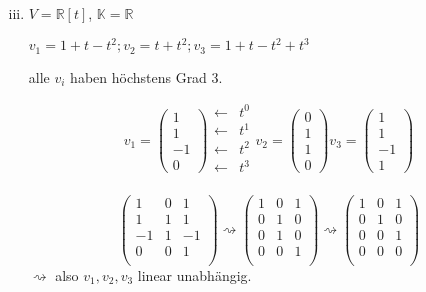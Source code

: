 \documentclass{article}
\begin{document}
\begin{enumerate}[(i)]
  \setcounter{enumi}{2}
\item $V = \mathbb{R}[t]$, $\mathbb{K} = \mathbb{R}$

  $v_1 = 1 + t - t^2; v_2 = t + t^2; v_3 = 1 + t - t^2 + t^3$

  alle $v_i$ haben höchstens Grad 3.

  \[
    v_1 =
    \begin{pmatrix}
      1 \\
      1 \\
      -1 \\
      0
    \end{pmatrix}
    \begin{array}{cc}
      \leftarrow & t^0 \\
      \leftarrow & t^1 \\
      \leftarrow & t^2 \\
      \leftarrow & t^3 \\
    \end{array}
    v_2 =
    \begin{pmatrix}
      0 \\
      1 \\
      1 \\
      0
    \end{pmatrix}
    v_3 =
    \begin{pmatrix}
      1 \\
      1 \\
      -1 \\
      1
    \end{pmatrix}
  \]

  \[
    \begin{pmatrix}
      1  & 0 & 1  \\
      1  & 1 & 1  \\
      -1 & 1 & -1 \\
      0  & 0 & 1  \\
    \end{pmatrix}
    \rightsquigarrow
    \begin{pmatrix}
      1 & 0 & 1 \\
      0 & 1 & 0 \\
      0 & 1 & 0 \\
      0 & 0 & 1 \\
    \end{pmatrix}
    \rightsquigarrow
    \begin{pmatrix}
      1 & 0 & 1 \\
      0 & 1 & 0 \\
      0 & 0 & 1 \\
      0 & 0 & 0 \\
    \end{pmatrix}
  \]
  $\rightsquigarrow$ also $v_1, v_2, v_3$ linear unabhängig.

\end{enumerate}
\end{document}
